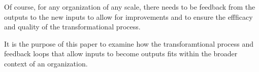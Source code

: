 Of course, for any organization of any scale, there needs to be feedback from the outputs to the new inputs to allow for improvements and to ensure the effficacy and quality of the transformational process.

It is the purpose of this paper to examine how the transforamtional process and feedback loops that allow inputs to become outputs fits within the broader context of an organization.
